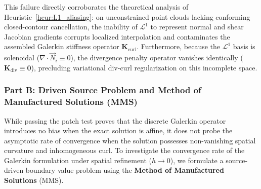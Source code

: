 \documentclass[preprint,12pt]{elsarticle}
\begin{document}
This failure directly corroborates the theoretical analysis of Heuristic~\ref{heur:L1_aliasing}: on unconstrained point clouds lacking conforming closed-contour cancellation, the inability of $\mathcal{L}^1$ to represent normal and shear Jacobian gradients corrupts localized interpolation and contaminates the assembled Galerkin stiffness operator $\mathbf{K}_{\mathrm{curl}}$. Furthermore, because the $\mathcal{L}^1$ basis is solenoidal ($\nabla \cdot \vec{N}_i \equiv 0$), the divergence penalty operator vanishes identically ($\mathbf{K}_{\mathrm{div}} \equiv \mathbf{0}$), precluding variational div-curl regularization on this incomplete space.

\subsubsection{Part B: Driven Source Problem and Method of Manufactured Solutions (MMS)}
\label{subsubsec:mms_driven_problem}

While passing the patch test proves that the discrete Galerkin operator introduces no bias when the exact solution is affine, it does not probe the asymptotic rate of convergence when the solution possesses non-vanishing spatial curvature and inhomogeneous curl. To investigate the convergence rate of the Galerkin formulation under spatial refinement ($h \to 0$), we formulate a source-driven boundary value problem using the \textbf{Method of Manufactured Solutions} (MMS).
\end{document}
